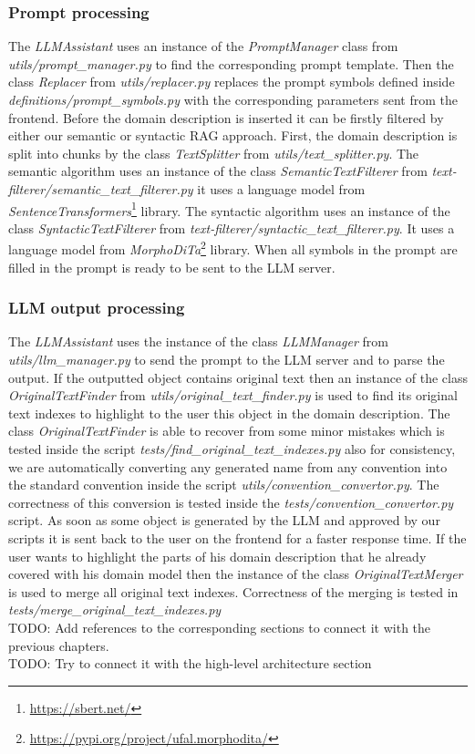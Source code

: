 \subsubsection{Prompt processing}

The \textit{LLMAssistant} uses an instance of the \textit{PromptManager} class from \textit{utils/prompt\_manager.py} to find the corresponding prompt template.
Then the class \textit{Replacer} from \textit{utils/replacer.py} replaces the prompt symbols defined inside \textit{definitions/prompt\_symbols.py} with the corresponding parameters sent from the frontend. Before the domain description is inserted it can be firstly filtered by either our semantic or syntactic RAG approach. First, the domain description is split into chunks by the class \textit{TextSplitter} from \textit{utils/text\_splitter.py}. The semantic algorithm uses an instance of the class \textit{SemanticTextFilterer} from \textit{text-filterer/semantic\_text\_filterer.py} it uses a language model from \textit{SentenceTransformers}\footnote{\url{https://sbert.net/}} library. The syntactic algorithm uses an instance of the class \textit{SyntacticTextFilterer} from \textit{text-filterer/syntactic\_text\_filterer.py}. It uses a language model from \textit{MorphoDiTa}\footnote{\url{https://pypi.org/project/ufal.morphodita/}} library. When all symbols in the prompt are filled in the prompt is ready to be sent to the LLM server.


\subsubsection{LLM output processing}

The \textit{LLMAssistant} uses the instance of the class \textit{LLMManager} from \textit{utils/llm\_manager.py} to send the prompt to the LLM server and to parse the output. If the outputted object contains original text then an instance of the class \textit{OriginalTextFinder} from \textit{utils/original\_text\_finder.py} is used to find its original text indexes to highlight to the user this object in the domain description. The class \textit{OriginalTextFinder} is able to recover from some minor mistakes which is tested inside the script \textit{tests/find\_original\_text\_indexes.py}
also for consistency, we are automatically converting any generated name from any convention into the standard convention inside the script \textit{utils/convention\_convertor.py}. The correctness of this conversion is tested inside the \textit{tests/convention\_convertor.py} script. As soon as some object is generated by the LLM and approved by our scripts it is sent back to the user on the frontend for a faster response time. If the user wants to highlight the parts of his domain description that he already covered with his domain model then the instance of the class \textit{OriginalTextMerger} is used to merge all original text indexes. Correctness of the merging is tested in \textit{tests/merge\_original\_text\_indexes.py} \\

\noindent{}TODO: Add references to the corresponding sections to connect it with the previous chapters. \\

\noindent{}TODO: Try to connect it with the high-level architecture section